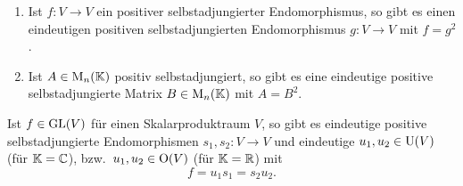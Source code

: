 \begin{proposition}[Wurzeln]
  \begin{enumerate}[leftmargin=*, label=\roman*)]
    \item
      Ist $f \colon V \to V$ ein positiver selbstadjungierter Endomorphismus, so gibt es einen eindeutigen positiven selbstadjungierten Endomorphismus $g \colon V \to V$ mit $f = g^2$.
    \item
      Ist $A \in \mathrm{M}_n(\mathbb{K})$ positiv selbstadjungiert, so gibt es eine eindeutige positive selbstadjungierte Matrix $B \in \mathrm{M}_n(\mathbb{K})$ mit $A = B^2$.
  \end{enumerate}
\end{proposition}


\begin{theorem}[Polarzerlegung]
  Ist $f \in \mathrm{GL}(V)$ für einen Skalarproduktraum $V$, so gibt es eindeutige positive selbstadjungierte Endomorphismen $s_1, s_2 \colon V \to V$ und eindeutige $u_1, u_2 \in \mathrm{U}(V)$ (für $\mathbb{K} = \mathbb{C}$), bzw.\ $u_1, u_2 \in \mathrm{O}(V)$ (für $\mathbb{K} = \mathbb{R}$) mit
  \[
    f = u_1 s_1 = s_2 u_2.
  \]
\end{theorem}




























